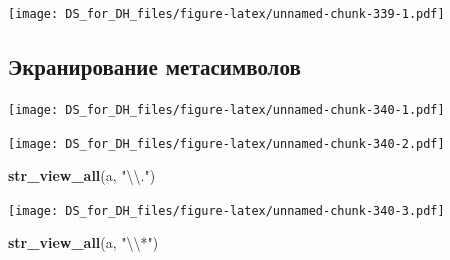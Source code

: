 \documentclass[
]{book}
\newenvironment{Shaded}{\begin{snugshade}}{\end{snugshade}}
\newcommand{\CharTok}[1]{\textcolor[rgb]{0.31,0.60,0.02}{#1}}
\newcommand{\KeywordTok}[1]{\textcolor[rgb]{0.13,0.29,0.53}{\textbf{#1}}}
\newcommand{\NormalTok}[1]{#1}
\newcommand{\StringTok}[1]{\textcolor[rgb]{0.31,0.60,0.02}{#1}}
\begin{document}
\texttt{[image: DS\_for\_DH\_files/figure-latex/unnamed-chunk-339-1.pdf]}

\hypertarget{ux44dux43aux440ux430ux43dux438ux440ux43eux432ux430ux43dux438ux435-ux43cux435ux442ux430ux441ux438ux43cux432ux43eux43bux43eux432}{%
\subsection{Экранирование метасимволов}\label{ux44dux43aux440ux430ux43dux438ux440ux43eux432ux430ux43dux438ux435-ux43cux435ux442ux430ux441ux438ux43cux432ux43eux43bux43eux432}}

\begin{Shaded}
\end{Shaded}

\texttt{[image: DS\_for\_DH\_files/figure-latex/unnamed-chunk-340-1.pdf]}

\begin{Shaded}
\end{Shaded}

\texttt{[image: DS\_for\_DH\_files/figure-latex/unnamed-chunk-340-2.pdf]}

\begin{Shaded}
\begin{Highlighting}[]
\KeywordTok{str_view_all}\NormalTok{(a, }\StringTok{"}\CharTok{\textbackslash{}\textbackslash{}}\StringTok{."}\NormalTok{)}
\end{Highlighting}
\end{Shaded}

\texttt{[image: DS\_for\_DH\_files/figure-latex/unnamed-chunk-340-3.pdf]}

\begin{Shaded}
\begin{Highlighting}[]
\KeywordTok{str_view_all}\NormalTok{(a, }\StringTok{"}\CharTok{\textbackslash{}\textbackslash{}}\StringTok{*"}\NormalTok{)}
\end{Highlighting}
\end{Shaded}
\end{document}
